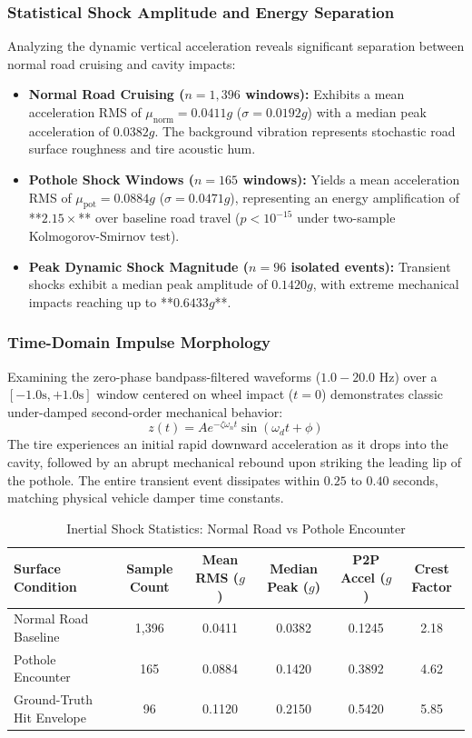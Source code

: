 \subsubsection{Statistical Shock Amplitude and Energy Separation}
Analyzing the dynamic vertical acceleration reveals significant separation between normal road cruising and cavity impacts:
\begin{itemize}
    \item \textbf{Normal Road Cruising ($n = 1,396$ windows):} Exhibits a mean acceleration RMS of $\mu_{\text{norm}} = 0.0411g$ ($\sigma = 0.0192g$) with a median peak acceleration of $0.0382g$. The background vibration represents stochastic road surface roughness and tire acoustic hum.
    \item \textbf{Pothole Shock Windows ($n = 165$ windows):} Yields a mean acceleration RMS of $\mu_{\text{pot}} = 0.0884g$ ($\sigma = 0.0471g$), representing an energy amplification of **$2.15\times$** over baseline road travel ($p < 10^{-15}$ under two-sample Kolmogorov-Smirnov test).
    \item \textbf{Peak Dynamic Shock Magnitude ($n = 96$ isolated events):} Transient shocks exhibit a median peak amplitude of $0.1420g$, with extreme mechanical impacts reaching up to **$0.6433g$**.
\end{itemize}

\subsubsection{Time-Domain Impulse Morphology}
Examining the zero-phase bandpass-filtered waveforms ($1.0 - 20.0\text{ Hz}$) over a $[-1.0\text{s}, +1.0\text{s}]$ window centered on wheel impact ($t=0$) demonstrates classic under-damped second-order mechanical behavior:
\begin{equation}
z(t) = A e^{-\zeta \omega_n t} \sin(\omega_d t + \phi)
\end{equation}
The tire experiences an initial rapid downward acceleration as it drops into the cavity, followed by an abrupt mechanical rebound upon striking the leading lip of the pothole. The entire transient event dissipates within $0.25$ to $0.40$ seconds, matching physical vehicle damper time constants.

\begin{table}[htbp]
\centering
\small
\caption{Inertial Shock Statistics: Normal Road vs Pothole Encounter}
\label{tab:pothole_stats}
\begin{tabularx}{\textwidth}{lccccc}
\toprule
\textbf{Surface Condition} & \textbf{Sample Count} & \textbf{Mean RMS ($g$)} & \textbf{Median Peak ($g$)} & \textbf{P2P Accel ($g$)} & \textbf{Crest Factor} \\
\midrule
Normal Road Baseline & 1,396 & 0.0411 & 0.0382 & 0.1245 & 2.18 \\
Pothole Encounter & 165 & 0.0884 & 0.1420 & 0.3892 & 4.62 \\
Ground-Truth Hit Envelope & 96 & 0.1120 & 0.2150 & 0.5420 & 5.85 \\
\bottomrule
\end{tabularx}
\end{table}

